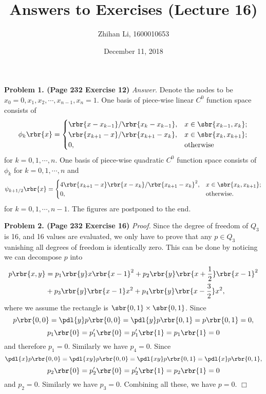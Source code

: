 \documentclass[english, nochinese]{pnote}
\title{Answers to Exercises (Lecture 16)}
\author{Zhihan Li, 1600010653}
\date{December 11, 2018}
\begin{document}
\maketitle

\textbf{Problem 1. (Page 232 Exercise 12)} \textit{Answer.} Denote the nodes to be $ x_0 = 0, x_1, x_2, \cdots, x_{ n - 1 }, x_n = 1 $. One basis of piece-wise linear $C^0$ function space consists of
\begin{equation}
\phi_k \rbr{x} =
\begin{cases}
\rbr{ x - x_{ k - 1 } } / \rbr{ x_k - x_{ k - 1 } }, & x \in \sbr{ x_{ k - 1 }, x_k }; \\
\rbr{ x_{ k + 1 } - x } / \rbr{ x_{ k + 1 } - x_k }, & x \in \sbr{ x_k, x_{ k + 1 } }; \\
0, & \text{otherwise}
\end{cases}
\end{equation}
for $ k = 0, 1, \cdots, n $.
One basis of piece-wise quadratic $C^0$ function space consists of $\phi_k$ for $ k = 0, 1, \cdots, n $ and
\begin{equation}
\psi_{ k + 1 / 2 } \rbr{x} =
\begin{cases}
4 \rbr{ x_{ k + 1 } - x } \rbr{ x - x_k } / \rbr{ x_{ k + 1 } - x_k }^2, & x \in \sbr{ x_k, x_{ k + 1 } }; \\
0, & \text{otherwise}.
\end{cases}
\end{equation}
for $ k = 0, 1, \cdots, n - 1 $. The figures are postponed to the end.

\textbf{Problem 2. (Page 232 Exercise 16)} \textit{Proof.} Since the degree of freedom of $Q_3$ is 16, and 16 values are evaluated, we only have to prove that any $ p \in Q_3 $ vanishing all degrees of freedom is identically zero. This can be done by noticing we can decompose $p$ into
\begin{equation}
\begin{split}
p \rbr{ x, y } &= p_1 \rbr{y} x \rbr{ x - 1 }^2 + p_2 \rbr{y} \rbr{ x + \frac{1}{2} } \rbr{ x - 1 }^2 \\
&+ p_3 \rbr{y} \rbr{ x - 1 } x^2 + p_4 \rbr{y} \rbr{ x - \frac{3}{2} } x^2,
\end{split}
\end{equation}
where we assume the rectangle is $ \sbr{ 0, 1 } \times \sbr{ 0, 1 } $. Since
\begin{equation}
p \rbr{ 0, 0 } = \pdl{y} p \rbr{ 0, 0 } = \pdl{y} p \rbr{ 0, 1 } = p \rbr{ 0, 1 } = 0,
\end{equation}
\begin{equation}
p_1 \rbr{0} = p_1' \rbr{0} = p_1' \rbr{1} = p_1 \rbr{1} = 0
\end{equation}
and therefore $ p_1 = 0 $. Similarly we have $ p_4 = 0 $. Since
\begin{equation}
\pdl{x} p \rbr{ 0, 0 } = \pdl{ x y } p \rbr{ 0, 0 } = \pdl{ x y } p \rbr{ 0, 1 } = \pdl{x} p \rbr{ 0, 1 },
\end{equation}
\begin{equation}
p_2 \rbr{0} = p_2' \rbr{0} = p_2' \rbr{1} = p_2 \rbr{1} = 0
\end{equation}
and $ p_2 = 0 $. Similarly we have $ p_3 = 0 $. Combining all these, we have $ p = 0 $.
\hfill$\Box$
\end{document}
